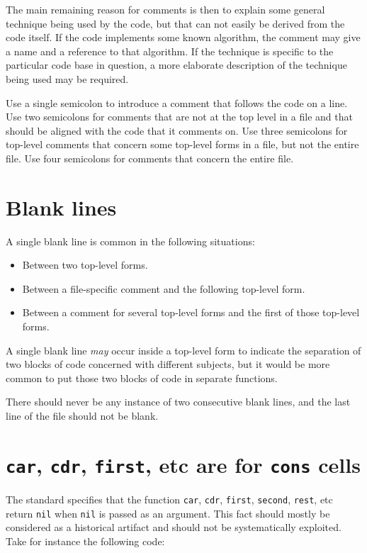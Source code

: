The main remaining reason for comments is then to explain some
general technique being used by the code, but that can not easily be
derived from the code itself.  If the code implements some known
algorithm, the comment may give a name and a reference to that
algorithm.  If the technique is specific to the particular code base
in question, a more elaborate description of the technique being used
may be required.

Use a single semicolon to introduce a comment that follows the code on
a line.  Use two semicolons for comments that are not at the top level
in a file and that should be aligned with the code that it comments
on.  Use three semicolons for top-level comments that concern some
top-level forms in a file, but not the entire file.  Use four
semicolons for comments that concern the entire file.

\section{Blank lines}

A single blank line is common in the following situations:

\begin{itemize}
\item Between two top-level forms.
\item Between a file-specific comment and the following top-level
  form.
\item Between a comment for several top-level forms and the first
  of those top-level forms.
\end{itemize}

A single blank line \emph{may} occur inside a top-level form to
indicate the separation of two blocks of code concerned with different
subjects, but it would be more common to put those two blocks of code
in separate functions.

There should never be any instance of two consecutive blank lines, and
the last line of the file should not be blank.

\section{\texttt{car}, \texttt{cdr}, \texttt{first}, etc are for
  \texttt{cons} cells}

The \commonlisp{} standard specifies that the function \texttt{car},
\texttt{cdr}, \texttt{first}, \texttt{second}, \texttt{rest}, etc
return \texttt{nil} when \texttt{nil} is passed as an argument.  This
fact should mostly be considered as a historical artifact and should
not be systematically exploited.  Take for instance the following
code:


